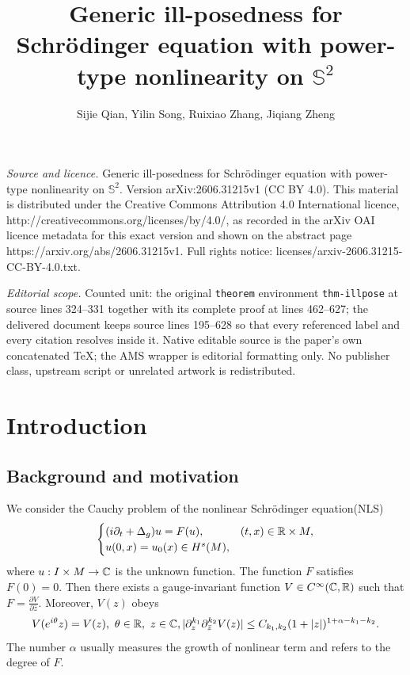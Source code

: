 \documentclass[10pt,a4paper]{amsart}
\numberwithin{equation}{section}
\begin{document}
\title[Generic ill-posedness for Schr"odinger equation with power-t]{Generic ill-posedness for Schr\"odinger equation with power-type nonlinearity on $\mathbb{S}^2$}
\author{Sijie Qian, Yilin Song, Ruixiao Zhang, Jiqiang Zheng}
\date{}
\maketitle
\noindent\emph{Source and licence.} Generic ill-posedness for Schr\"odinger equation with power-type nonlinearity on $\mathbb{S}^2$. Version arXiv:2606.31215v1 (CC BY 4.0). This material is distributed under the Creative Commons Attribution 4.0 International licence, http://creativecommons.org/licenses/by/4.0/, as recorded in the arXiv OAI licence metadata for this exact version and shown on the abstract page https://arxiv.org/abs/2606.31215v1. Full rights notice: licenses/arxiv-2606.31215-CC-BY-4.0.txt.\par\smallskip
\noindent\textit{Editorial scope.} Counted unit: the original \texttt{theorem} environment \texttt{thm-illpose} at source lines 324--331 together with its complete proof at lines 462--627; the delivered document keeps source lines 195--628 so that every referenced label and every citation resolves inside it. Native editable source is the paper's own concatenated TeX; the AMS wrapper is editorial formatting only. No publisher class, upstream script or unrelated artwork is redistributed.
\section{Introduction}
\subsection{Background and motivation}
We consider the Cauchy problem of the nonlinear Schr\"odinger equation(NLS)
\begin{equation}\label{fml-NLS}
\begin{cases}
(i\partial_{t}+\Delta_g)u=F(u) , &(t,x)\in\Bbb{R}\times M, \\
u(0,x)=u_{0}(x)\in H^s(M),
\end{cases}
\end{equation}
where $u:I\times M\to\Bbb C $ is the unknown function. The function $F$ satisfies $F(0)=0$. Then there exists a gauge-invariant function $V\in C^\infty(\Bbb C,\Bbb R)$ such that $F=\frac{\partial V}{\partial \bar{z}}$. Moreover, $V(z)$ obeys 
\begin{gather}\label{condition-2}
 V(e^{i\theta}z)=V(z),\,\,\theta\in\Bbb R,\,\,z\in\Bbb C,
  |\partial_z^{k_1}\partial_{\bar{z}}^{k_2}V(z)|\leq C_{k_1,k_2}(1+|z|)^{1+\alpha-k_1-k_2}.
\end{gather}
The number $\alpha$ usually measures the growth of nonlinear term and refers to the degree of $F$.
	
\end{document}
